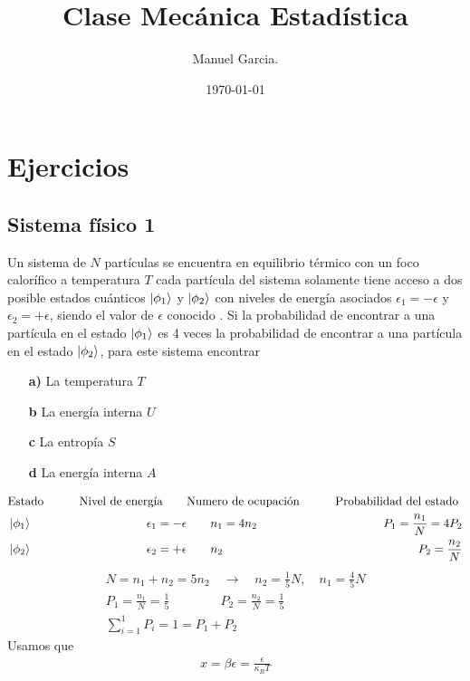 \documentclass{article}
\title{Clase Mecánica Estadística }
\author{Manuel Garcia.}
\date{\today}
\begin{document}
\maketitle

\section{Ejercicios }
\subsection{Sistema físico 1 }
Un sistema de $ N  $ partículas se encuentra en equilibrio térmico con un foco calorífico a temperatura $ T  $ cada partícula  del sistema solamente tiene acceso a dos posible estados cuánticos $ \ket{\phi_1 } $ y $ \ket{\phi_2 } $ con niveles de energía asociados $ \epsilon_1 = -\epsilon  $ y $ \epsilon_2 = + \epsilon  $, siendo el valor de $ \epsilon $ conocido . Si la probabilidad de encontrar a una partícula en el estado $ \ket{\phi_1 } $ es 4 veces la probabilidad de encontrar a una partícula en el estado $ \ket{\phi_2 } $, para este sistema encontrar 
\begin{itemize}
  \item[\textbf{a)}] La temperatura $ T  $
  \item[\textbf{b}] La energía interna $ U  $
  \item[\textbf{c}] La entropía $ S  $
  \item[\textbf{d}] La energía interna $ A  $
\end{itemize}
\begin{align*}
  &\text{Estado} \qquad &\text{Nivel de energía}  \qquad &\text{Numero de ocupación} \qquad &\text{Probabilidad del estado } \\
  &\ket{\phi_1 } &\qquad\epsilon_1 = -\epsilon  &\qquad n_1 = 4 n_2 &\qquad P_1 = \frac{n_1 }{N } = 4P_2 \\
  &\ket{\phi_2 } &\qquad\epsilon_2 = +\epsilon  &\qquad n_2  &\qquad P_2 = \frac{n_2 }{N }\\
\end{align*}
\begin{gather*}
  N = n_1 + n_2 = 5n_2 \quad \rightarrow \quad n_2 = \frac{1}{5}N , \quad n_1 = \frac{4}{5}N \\
  P_1 = \frac{n_1 }{N } = \frac{1}{5} \qquad \qquad P_2 = \frac{n_2 }{N } = \frac{1}{5}\\
  \displaystyle\sum_{i=1 }^{1 } P_i = 1 = P_1 + P_2 
\end{gather*}
Usamos que 
\begin{gather*}
  x = \beta \epsilon = \frac{\epsilon}{\kappa_B T } 
\end{gather*}
\end{document}
